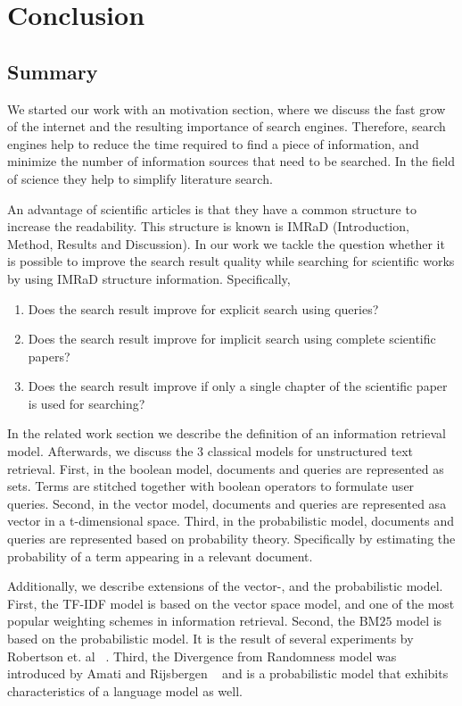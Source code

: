 \chapter{Conclusion}
\label{cha:conclusion}


\section{Summary}
\label{sec:summary}

We started our work with an motivation section, where we discuss the fast grow of the internet and the resulting importance of search engines. Therefore, search engines help to reduce the time required to find a piece of information, and minimize the number of information sources that need to be searched. In the field of science they help to simplify literature search. 

An advantage of scientific articles is that they have a common structure to increase the readability. This structure is known is IMRaD (Introduction, Method, Results and Discussion). In our work we tackle the question whether it is possible to improve the search result quality while searching for scientific works by using IMRaD structure information. Specifically, 
\begin{enumerate}[label=(\alph*)]
  \item Does the search result improve for explicit search using queries?
  \item Does the search result improve for implicit search using complete scientific papers?
  \item Does the search result improve if only a single chapter of the scientific paper is used for searching?
\end{enumerate}
In the related work section we describe the definition of an information retrieval model. Afterwards, we discuss the $3$ classical models for unstructured text retrieval. First, in the boolean model, documents and queries are represented as sets. Terms are stitched together with boolean operators to formulate user queries. Second, in the vector model, documents and queries are represented asa vector in a t-dimensional space. Third, in the probabilistic model, documents and queries are represented based on probability theory. Specifically by estimating the probability of a term appearing in a relevant document.

Additionally, we describe extensions of the vector-, and the probabilistic model. First, the TF-IDF model is based on the vector space model, and one of the most popular weighting schemes in information retrieval. Second, the BM$25$ model is based on the probabilistic model. It is the result of several experiments by Robertson et. al ~\cite{RobertsonWHGL92, RobertsonWJHG93, RobertsonWJHG94}. Third, the Divergence from Randomness model was introduced by Amati and Rijsbergen ~\cite{AmatiR02} and is a probabilistic model that exhibits characteristics of a language model as well.

